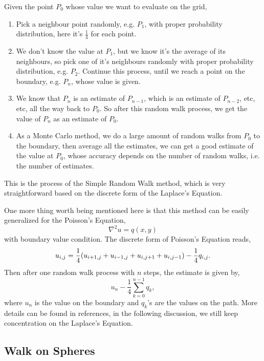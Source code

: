 \documentclass[aps, prl, preprint, groupedaddress]{revtex4-1}
\begin{document}
Given the point $P_0$ whose value we want to evaluate on the grid,
\begin{enumerate}
    \item Pick a neighbour point randomly, e.g. $P_1$, with proper probability distribution, here it's $\frac{1}{4}$ for each point.
    \item We don't know the value at $P_1$, but we know it's the average of its neighbours, so pick one of it's neighbours randomly with proper probability distribution, e.g. $P_2$. Continue this process, until we reach a point on the boundary, e.g. $P_n$, whose value is given.
    \item We know that $P_n$ is an estimate of $P_{n-1}$, which is an estimate of $P_{n-2}$, etc, etc, all the way back to $P_0$. So after this random walk process, we get the value of $P_n$ as an estimate of $P_0$.
    \item As a Monte Carlo method, we do a large amount of random walks from $P_0$ to the boundary, then average all the estimates, we can get a good estimate of the value at $P_0$, whose accuracy depends on the number of random walks, i.e. the number of estimates.
\end{enumerate}
This is the process of the Simple Random Walk method, which is very straightforward based on the discrete form of the Laplace's Equation.

One more thing worth being mentioned here is that this method can be easily generalized for the Poisson's Equation,
\begin{equation}
    \nabla^2 u = q(x,y)
\end{equation}
with boundary value condition. The discrete form of Poisson's Equation reads,
\begin{equation}
    u_{i,j} = \frac{1}{4} \qty(u_{i+1,j}+u_{i-1,j}+u_{i,j+1}+u_{i,j-1}) - \frac{1}{4} q_{i,j}.
\end{equation}
Then after one random walk process with $n$ steps, the estimate is given by,
\begin{equation}
    u_n - \frac{1}{4}\sum_{k=0}^{n-1}q_k,
\end{equation}
where $u_n$ is the value on the boundary and $q_k$'s are the values on the path. More details can be found in references, in the following discussion, we still keep concentration on the Laplace's Equation.

\subsection{Walk on Spheres}
\end{document}
